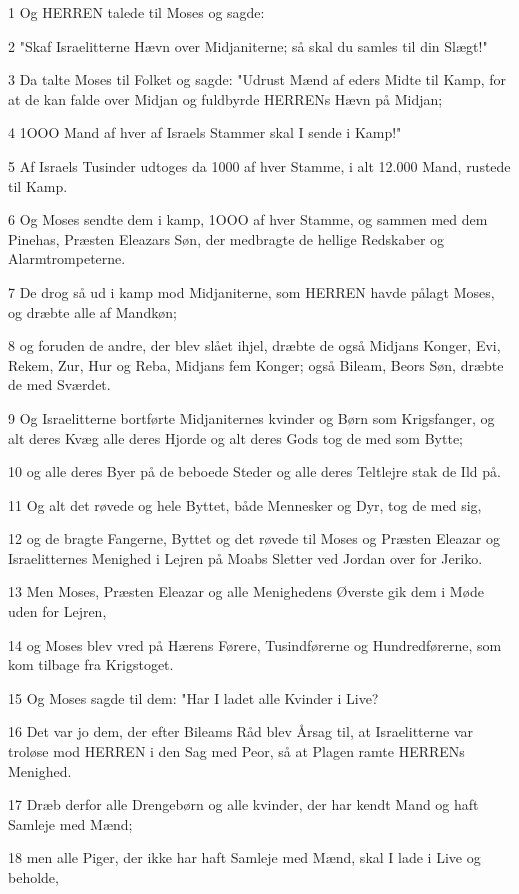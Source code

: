 \par 1 Og HERREN talede til Moses og sagde:
\par 2 "Skaf Israelitterne Hævn over Midjaniterne; så skal du samles til din Slægt!"
\par 3 Da talte Moses til Folket og sagde: "Udrust Mænd af eders Midte til Kamp, for at de kan falde over Midjan og fuldbyrde HERRENs Hævn på Midjan;
\par 4 1OOO Mand af hver af Israels Stammer skal I sende i Kamp!"
\par 5 Af Israels Tusinder udtoges da 1000 af hver Stamme, i alt 12.000 Mand, rustede til Kamp.
\par 6 Og Moses sendte dem i kamp, 1OOO af hver Stamme, og sammen med dem Pinehas, Præsten Eleazars Søn, der medbragte de hellige Redskaber og Alarmtrompeterne.
\par 7 De drog så ud i kamp mod Midjaniterne, som HERREN havde pålagt Moses, og dræbte alle af Mandkøn;
\par 8 og foruden de andre, der blev slået ihjel, dræbte de også Midjans Konger, Evi, Rekem, Zur, Hur og Reba, Midjans fem Konger; også Bileam, Beors Søn, dræbte de med Sværdet.
\par 9 Og Israelitterne bortførte Midjaniternes kvinder og Børn som Krigsfanger, og alt deres Kvæg alle deres Hjorde og alt deres Gods tog de med som Bytte;
\par 10 og alle deres Byer på de beboede Steder og alle deres Teltlejre stak de Ild på.
\par 11 Og alt det røvede og hele Byttet, både Mennesker og Dyr, tog de med sig,
\par 12 og de bragte Fangerne, Byttet og det røvede til Moses og Præsten Eleazar og Israelitternes Menighed i Lejren på Moabs Sletter ved Jordan over for Jeriko.
\par 13 Men Moses, Præsten Eleazar og alle Menighedens Øverste gik dem i Møde uden for Lejren,
\par 14 og Moses blev vred på Hærens Førere, Tusindførerne og Hundredførerne, som kom tilbage fra Krigstoget.
\par 15 Og Moses sagde til dem: "Har I ladet alle Kvinder i Live?
\par 16 Det var jo dem, der efter Bileams Råd blev Årsag til, at Israelitterne var troløse mod HERREN i den Sag med Peor, så at Plagen ramte HERRENs Menighed.
\par 17 Dræb derfor alle Drengebørn og alle kvinder, der har kendt Mand og haft Samleje med Mænd;
\par 18 men alle Piger, der ikke har haft Samleje med Mænd, skal I lade i Live og beholde,
